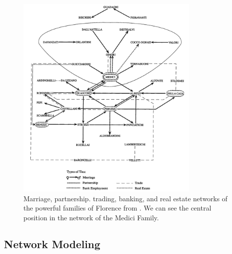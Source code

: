 \begin{figure}[!ht]
    \centering %
    \includegraphics[width=0.8\textwidth]{static/figures/RelatedWork/padgett-Medicis.png}
    \caption{Marriage, partnership. trading, banking, and real estate networks of the powerful families of Florence from \cite{padgettRobustActionRise1993}. We can see the central position in the network of the Medici Family.}
    \label{fig:padgett-medicis}
\end{figure}



\subsection{Network Modeling}


